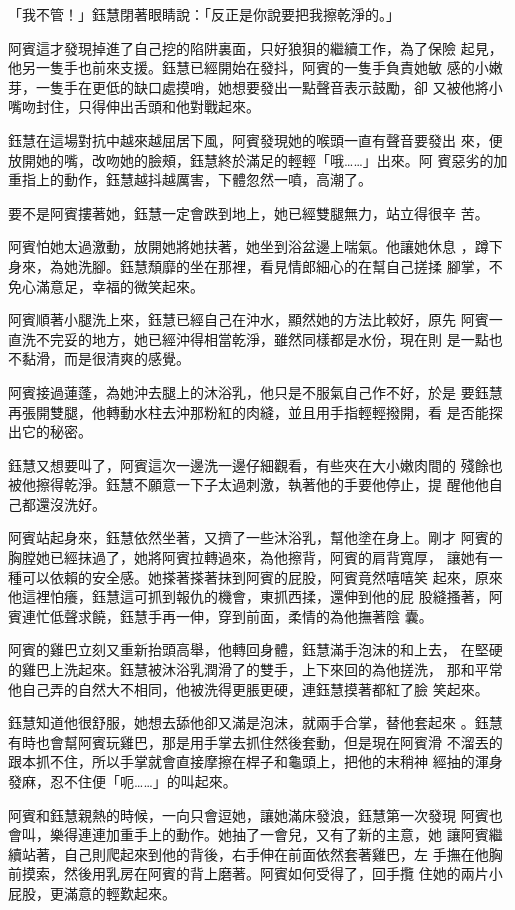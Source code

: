 「我不管！」鈺慧閉著眼睛說：「反正是你說要把我擦乾淨的。」

阿賓這才發現掉進了自己挖的陷阱裏面，只好狼狽的繼續工作，為了保險
起見，他另一隻手也前來支援。鈺慧已經開始在發抖，阿賓的一隻手負責她敏
感的小嫩芽，一隻手在更低的缺口處摸哨，她想要發出一點聲音表示鼓勵，卻
又被他將小嘴吻封住，只得伸出舌頭和他對戰起來。

鈺慧在這場對抗中越來越屈居下風，阿賓發現她的喉頭一直有聲音要發出
來，便放開她的嘴，改吻她的臉頰，鈺慧終於滿足的輕輕「哦……」出來。阿
賓惡劣的加重指上的動作，鈺慧越抖越厲害，下體忽然一噴，高潮了。

要不是阿賓摟著她，鈺慧一定會跌到地上，她已經雙腿無力，站立得很辛
苦。

阿賓怕她太過激動，放開她將她扶著，她坐到浴盆邊上喘氣。他讓她休息
，蹲下身來，為她洗腳。鈺慧頹靡的坐在那裡，看見情郎細心的在幫自己搓揉
腳掌，不免心滿意足，幸福的微笑起來。

阿賓順著小腿洗上來，鈺慧已經自己在沖水，顯然她的方法比較好，原先
阿賓一直洗不完妥的地方，她已經沖得相當乾淨，雖然同樣都是水份，現在則
是一點也不黏滑，而是很清爽的感覺。

阿賓接過蓮蓬，為她沖去腿上的沐浴乳，他只是不服氣自己作不好，於是
要鈺慧再張開雙腿，他轉動水柱去沖那粉紅的肉縫，並且用手指輕輕撥開，看
是否能探出它的秘密。

鈺慧又想要叫了，阿賓這次一邊洗一邊仔細觀看，有些夾在大小嫩肉間的
殘餘也被他擦得乾淨。鈺慧不願意一下子太過刺激，執著他的手要他停止，提
醒他他自己都還沒洗好。

阿賓站起身來，鈺慧依然坐著，又擠了一些沐浴乳，幫他塗在身上。剛才
阿賓的胸膛她已經抹過了，她將阿賓拉轉過來，為他擦背，阿賓的肩背寬厚，
讓她有一種可以依賴的安全感。她搽著搽著抹到阿賓的屁股，阿賓竟然嘻嘻笑
起來，原來他這裡怕癢，鈺慧這可抓到報仇的機會，東抓西揉，還伸到他的屁
股縫搔著，阿賓連忙低聲求饒，鈺慧手再一伸，穿到前面，柔情的為他撫著陰
囊。

阿賓的雞巴立刻又重新抬頭高舉，他轉回身體，鈺慧滿手泡沫的和上去，
在堅硬的雞巴上洗起來。鈺慧被沐浴乳潤滑了的雙手，上下來回的為他搓洗，
那和平常他自己弄的自然大不相同，他被洗得更脹更硬，連鈺慧摸著都紅了臉
笑起來。

鈺慧知道他很舒服，她想去舔他卻又滿是泡沫，就兩手合掌，替他套起來
。鈺慧有時也會幫阿賓玩雞巴，那是用手掌去抓住然後套動，但是現在阿賓滑
不溜丟的跟本抓不住，所以手掌就會直接摩擦在桿子和龜頭上，把他的末稍神
經抽的渾身發麻，忍不住便「呃……」的叫起來。

阿賓和鈺慧親熱的時候，一向只會逗她，讓她滿床發浪，鈺慧第一次發現
阿賓也會叫，樂得連連加重手上的動作。她抽了一會兒，又有了新的主意，她
讓阿賓繼續站著，自己則爬起來到他的背後，右手伸在前面依然套著雞巴，左
手撫在他胸前摸索，然後用乳房在阿賓的背上磨著。阿賓如何受得了，回手攬
住她的兩片小屁股，更滿意的輕歎起來。

